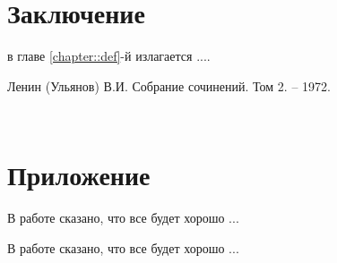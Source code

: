\documentclass[a4paper,12pt, landscape]{report}
\begin{document}

\chapter{Заключение}

в главе \ref{chapter::def}-й излагается ....


\begin{thebibliography}{100}
 Ленин (Ульянов) В.И. Собрание сочинений. Том 2. -- 1972.
\end{thebibliography}

\texttt{}
\tt

\chapter{Приложение}

В работе \cite{lenin123} сказано, что все будет хорошо ...

В работе \cite{lenin123} сказано, что все будет хорошо ...
\end{document}

